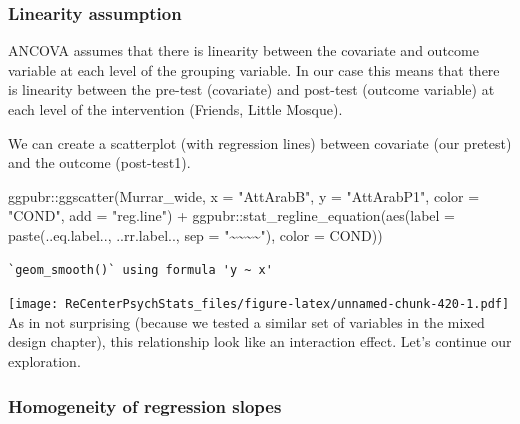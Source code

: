 \documentclass[
  11pt,
]{book}
\newenvironment{Shaded}{\begin{snugshade}}{\end{snugshade}}
\newcommand{\AttributeTok}[1]{\textcolor[rgb]{0.77,0.63,0.00}{#1}}
\newcommand{\FunctionTok}[1]{\textcolor[rgb]{0.00,0.00,0.00}{#1}}
\newcommand{\NormalTok}[1]{#1}
\newcommand{\SpecialCharTok}[1]{\textcolor[rgb]{0.00,0.00,0.00}{#1}}
\newcommand{\StringTok}[1]{\textcolor[rgb]{0.31,0.60,0.02}{#1}}
\begin{document}
\hypertarget{linearity-assumption}{%
\subsubsection{Linearity assumption}\label{linearity-assumption}}

ANCOVA assumes that there is linearity between the covariate and outcome variable at each level of the grouping variable. In our case this means that there is linearity between the pre-test (covariate) and post-test (outcome variable) at each level of the intervention (Friends, Little Mosque).

We can create a scatterplot (with regression lines) between covariate (our pretest) and the outcome (post-test1).

\begin{Shaded}
\begin{Highlighting}[]
\NormalTok{ggpubr}\SpecialCharTok{::}\FunctionTok{ggscatter}\NormalTok{(Murrar\_wide, }\AttributeTok{x =} \StringTok{"AttArabB"}\NormalTok{, }\AttributeTok{y =} \StringTok{"AttArabP1"}\NormalTok{, }\AttributeTok{color =} \StringTok{"COND"}\NormalTok{,}
    \AttributeTok{add =} \StringTok{"reg.line"}\NormalTok{) }\SpecialCharTok{+}\NormalTok{ ggpubr}\SpecialCharTok{::}\FunctionTok{stat\_regline\_equation}\NormalTok{(}\FunctionTok{aes}\NormalTok{(}\AttributeTok{label =} \FunctionTok{paste}\NormalTok{(..eq.label..,}
\NormalTok{    ..rr.label.., }\AttributeTok{sep =} \StringTok{"\textasciitilde{}\textasciitilde{}\textasciitilde{}\textasciitilde{}"}\NormalTok{), }\AttributeTok{color =}\NormalTok{ COND))}
\end{Highlighting}
\end{Shaded}

\begin{verbatim}
`geom_smooth()` using formula 'y ~ x'
\end{verbatim}

\texttt{[image: ReCenterPsychStats\_files/figure-latex/unnamed-chunk-420-1.pdf]}
As in not surprising (because we tested a similar set of variables in the mixed design chapter), this relationship look like an interaction effect. Let's continue our exploration.

\hypertarget{homogeneity-of-regression-slopes}{%
\subsubsection{Homogeneity of regression slopes}\label{homogeneity-of-regression-slopes}}
\end{document}
